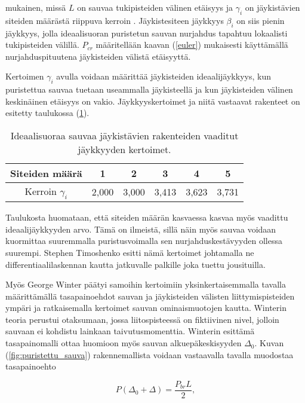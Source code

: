 \documentclass[12pt]{article}
\newenvironment{content}{\pagenumbering{arabic}}{}
\begin{document}
\begin{content}
mukainen, missä $L$ on sauvaa tukipisteiden välinen etäisyys ja $\gamma_i$ on jäykistävien siteiden määrästä riippuva kerroin \parencite[76]{timoshenko}. Jäykistesiteen jäykkyys $\beta_i$ on siis pienin jäykkyys, jolla ideaalisuoran puristetun sauvan nurjahdus tapahtuu lokaalisti tukipisteiden välillä. $P_{cr}$ määritellään kaavan (\ref{euler}) mukaisesti käyttämällä nurjahduspituutena jäykisteiden välistä etäisyyttä. 

Kertoimen $\gamma_i$ avulla voidaan määrittää jäykisteiden ideaalijäykkyys, kun puristettua sauvaa tuetaan useammalla jäykisteellä ja kun jäykisteiden välinen keskinäinen etäisyys on vakio. Jäykkyyskertoimet ja niitä vastaavat rakenteet on esitetty taulukossa (\ref{tab:ideaalijäykkyydet}).

\begin{table}[htb]
\centering
\caption{Ideaalisuoraa sauvaa jäykistävien rakenteiden vaaditut jäykkyyden kertoimet.}
\begin{tabular}{c c c c c c}
\label{tab:ideaalijäykkyydet}

Siteiden määrä & 1 & 2 & 3 & 4 & 5   \\
\hline
Kerroin $\gamma_i$ & 2,000 &3,000 & 3,413 & 3,623 & 3,731 
\end{tabular}
\end{table}

Taulukosta huomataan, että siteiden määrän kasvaessa kasvaa myös vaadittu ideaalijäykkyyden arvo. Tämä on ilmeistä, sillä näin myös sauvaa voidaan kuormittaa suuremmalla puristusvoimalla sen nurjahduskestävyyden ollessa suurempi. Stephen Timoshenko esitti nämä kertoimet \parencite{timoshenko} johtamalla ne differentiaalilaskennan kautta jatkuvalle palkille joka tuettu jousituilla. 

Myös George Winter päätyi samoihin kertoimiin \parencite{winter} yksinkertaisemmalla tavalla määrittämällä tasapainoehdot sauvan ja jäykisteiden välisten liittymispisteiden ympäri ja ratkaisemalla kertoimet sauvan ominaismuotojen kautta. Winterin teoria perustui otaksumaan, jossa liitospisteessä on fiktiivinen nivel, jolloin sauvaan ei kohdistu lainkaan taivutusmomenttia. Winterin esittämä tasapainomalli ottaa huomioon myös sauvan alkuepäkeskisyyden $\Delta_0$. Kuvan (\ref{fig:puristettu_sauva}) rakennemallista voidaan vastaavalla tavalla muodostaa tasapainoehto

\begin{equation}
\label{tasapainoehto}
P (\Delta_0 + \Delta) = \frac{P_{br} L}{2},
\end{equation}


\end{content}
\end{document}
